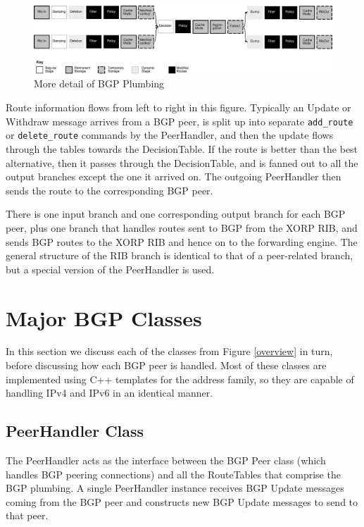 \documentclass[11pt]{article}
\begin{document}
\begin{figure}[htb]
\centerline{\includegraphics[width=1.0\textwidth]{figs/bgp-pipeline}}
\vspace{.05in}
\caption{\label{plumbing}More detail of BGP Plumbing}
\end{figure}

Route information flows from left to right in this figure.  Typically
an Update or Withdraw message arrives from a BGP peer, is split up
into separate {\tt add\_route} or {\tt delete\_route} commands by the
PeerHandler, and then the update flows through the tables towards the
DecisionTable.  If the route is better than the best alternative, then
it passes through the DecisionTable, and is fanned out to all the
output branches except the one it arrived on.  The outgoing
PeerHandler then sends the route to the corresponding BGP peer.

There is one input branch and one corresponding output branch for each
BGP peer, plus one branch that handles routes sent to BGP from the
XORP RIB, and sends BGP routes to the XORP RIB and hence on to the
forwarding engine.  The general structure of the RIB branch is
identical to that of a peer-related branch, but a special version of
the PeerHandler is used.

\section{Major BGP Classes}
In this section we discuss each of the classes from Figure \ref{overview} in
turn, before discussing how each BGP peer is handled.  Most of these
classes are implemented using C++ templates for the address family, so
they are capable of handling IPv4 and IPv6 in an identical manner.
\subsection{PeerHandler Class}
The PeerHandler acts as the interface between the BGP Peer class
(which handles BGP peering connections) and all the RouteTables that
comprise the BGP plumbing.  A single PeerHandler instance receives 
BGP Update messages coming from the BGP peer and constructs new BGP
Update messages to send to that peer.
\end{document}
